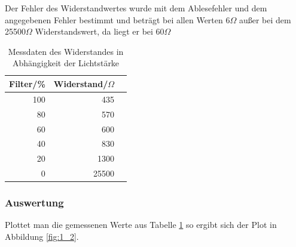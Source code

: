 \documentclass[12pt,a4paper]{article}
\begin{document}
Der Fehler des Widerstandwertes wurde mit dem Ablesefehler und dem angegebenen Fehler bestimmt und beträgt bei allen Werten 6$\Omega$ außer bei dem 25500$\Omega$ Widerstandswert, da liegt er bei 60$\Omega$

\begin{table}[H]
\centering
\begin{tabular}{|r|r|r|}
\hline
\multicolumn{1}{|l|}{Filter/\%} & \multicolumn{1}{l|}{Widerstand/$\Omega$} \\ \hline
100 & 435 \\ \hline
80 & 570 \\ \hline
60 & 600 \\ \hline
40 & 830 \\ \hline
20 & 1300 \\ \hline
0 & 25500 \\ \hline
\end{tabular}
\caption{Messdaten des Widerstandes in Abhängigkeit der Lichtstärke}
\label{tab:1_2}
\end{table}


\subsubsection*{Auswertung}

Plottet man die gemessenen Werte aus Tabelle \ref{tab:1_2} so ergibt sich der Plot in Abbildung \ref{fig:1_2}.
\end{document}
